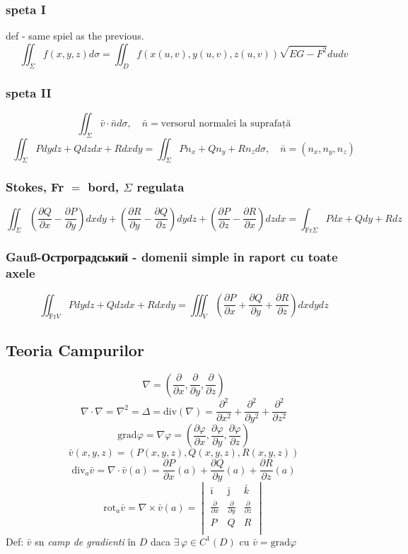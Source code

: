 \documentclass{article}
\newcommand{\parti}[2]{\frac{\partial #1}{ \partial #2}}
\newcommand{\partii}[2]{\frac{\partial^2 #1}{ \partial #2^2}}
\newcommand*{\grad}{\mathrm{grad}}
\renewcommand*{\div}{\mathrm{div}}
\newcommand*{\rot}{\mathrm{rot}}
\begin{document}
\subsubsection*{speta I}
def - same spiel as the previous.
\[\iint_{\Sigma} f(x, y,z) d\sigma = \iint_{D} f(x(u, v), y(u,v), z(u,v)) \sqrt{EG-F^2}du dv\]
\subsubsection*{speta II}
\[ \iint_{\Sigma}\bar{v}\cdot\bar{n} d\sigma, \quad \bar{n} = \text{versorul normalei la suprafață} \]
\[ \iint_{\Sigma} Pdy dz + Q dz dx + R dx dy = \iint_{\Sigma} Pn_x+Qn_y+Rn_z d\sigma, \quad \bar{n} = (n_x, n_y, n_z) \]
\subsubsection*{Stokes, Fr $= $ bord, $\Sigma$ regulata}
\[ \iint_\Sigma \left( \parti Q x - \parti P y \right) dx dy
 + \left( \parti R y - \parti Q z \right)  dy dz
 +\left( \parti P z - \parti R x \right) dz dx = \int_{\mathrm{Fr}\Sigma} Pdx+Qdy+Rdz \]
\subsubsection*{Gauß-Остроградський - domenii simple in raport cu toate axele}
\[ \iint_{\mathrm{Fr} V}Pdydz+Qdzdx+Rdxdy = \iiint_V \left( \parti P x + \parti Q y + \parti R z \right) dx dy dz \]
\subsection*{Teoria Campurilor}
\[ \nabla = (\parti{}{x}, \parti{}{y}, \parti{}{z}) \]
\[ \nabla \cdot \nabla = \nabla^2 = \Delta = \div(\nabla) = \partii{}{x}+\partii{}{y} +\partii{}{z} \]
\[ \grad \varphi = \nabla \varphi = (\parti{\varphi}{x}, \parti{\varphi}{y}, \parti{\varphi}{z}) \]
\[ \bar{v} (x, y, z) = (P(x, y, z), Q(x,y,z ), R(x, y,z)) \]
\[ \div_a\bar{v} = \nabla \cdot \bar{v}(a) = \parti{P}{x}(a)+\parti{Q}{y}(a) + \parti{R}{z}(a)\]
\[ \rot_a\bar{v} = \nabla \times \bar{v}(a) = \begin{vmatrix}
    \bar{\imath} & \bar{\jmath} & \bar{k}\\
    \parti{}{x}& \parti{}{y} & \parti{}{z} \\
    P & Q & R\\
  \end{vmatrix} \]
Def: $\bar{v}$ sn \emph{camp de gradienti} în $D$ daca $\exists\, \varphi \in C^1(D) $ cu $\bar{v} = \grad \varphi $
\end{document}
